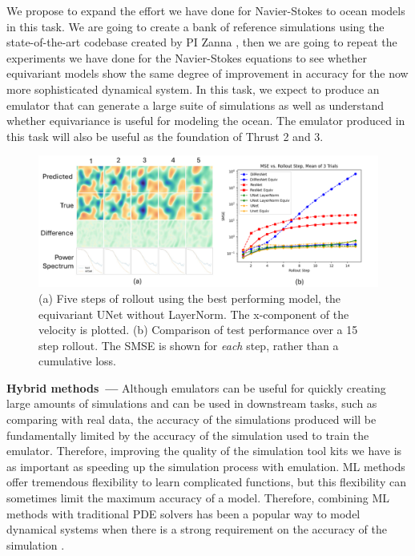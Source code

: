 \documentclass[11pt]{article}
\renewcommand{\paragraph}[1]{\medskip\par\noindent\textbf{#1~---}}
\begin{document}
We propose to expand the effort we have done for Navier-Stokes to ocean models in this task. We are going to create a bank of reference simulations using the state-of-the-art codebase created by PI Zanna \cite{pyqg}, then we are going to repeat the experiments we have done for the Navier-Stokes equations to see whether equivariant models show the same degree of improvement in accuracy for the now more sophisticated dynamical system. In this task, we expect to produce an emulator that can generate a large suite of simulations as well as understand whether equivariance is useful for modeling the ocean. The emulator produced in this task will also be useful as the foundation of Thrust 2 and 3.

\begin{figure}
    \includegraphics[width=\textwidth]{figures/cfd_results.pdf}
    \caption{(a) Five steps of rollout using the best performing model, the equivariant UNet without LayerNorm. 
    The x-component of the velocity is plotted.
    (b) Comparison of test performance over a 15 step rollout.
    The SMSE is shown for \textit{each} step, rather than a cumulative loss.}
    \label{fig:cfd_results}
\end{figure}

\paragraph{Hybrid methods}
Although emulators can be useful for quickly creating large amounts of simulations and can be used in downstream tasks, such as comparing with real data, the accuracy of the simulations produced will be fundamentally limited by the accuracy of the simulation used to train the emulator. Therefore, improving the quality of the simulation tool kits we have is as important as speeding up the simulation process with emulation. ML methods offer tremendous flexibility to learn complicated functions, but this flexibility can sometimes limit the maximum accuracy of a model. Therefore, combining ML methods with traditional PDE solvers has been a popular way to model dynamical systems when there is a strong requirement on the accuracy of the simulation \cite{Kidger2022OnND, Rackauckas2020UniversalDE}.
\end{document}
